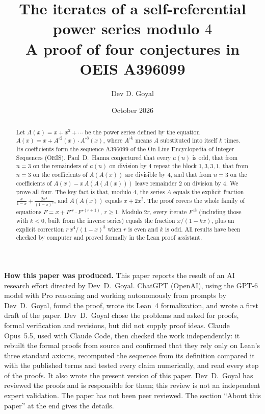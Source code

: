 \documentclass[11pt,a4paper]{article}
\title{The iterates of a self-referential power series modulo $4$\\[6pt]\large A proof of four conjectures in OEIS A396099}
\author{Dev D. Goyal}
\date{October 2026}
\theoremstyle{definition}
\theoremstyle{remark}
\begin{document}
\maketitle
\begin{abstract}
Let $A(x)=x+x^2+\cdots$ be the power series defined by the equation
$A(x)=x+A^{\circ2}(x)\cdot A^{\circ3}(x)$, where $A^{\circ k}$ means $A$ substituted into
itself $k$ times. Its coefficients form the sequence A396099 of the On-Line Encyclopedia of Integer Sequences
(OEIS). Paul~D.~Hanna conjectured that every $a(n)$ is odd, that from $n=3$ on the remainders of $a(n)$ on division by $4$ repeat
the block $1,3,3,1$, that from $n=3$ on the coefficients of $A(A(x))$ are divisible by $4$, and that from $n=3$ on
the coefficients of $A(x)-x\,A(A(A(x)))$ leave remainder $2$ on division by $4$. We prove all four. The key fact is that, modulo $4$, the series $A$ equals the explicit fraction
$\frac{x}{1-x}+\frac{2x^4}{(1-x)^3}$, and $A(A(x))$ equals $x+2x^2$. The proof covers the whole family of
equations $F=x+F^{\circ r}\cdot F^{\circ(r+1)}$, $r\ge1$. Modulo $2r$, every iterate $F^{\circ k}$ (including those
with $k<0$, built from the inverse series) equals the fraction $x/(1-kx)$, plus an explicit correction
$r\,x^4/(1-x)^3$ when $r$ is even and $k$ is odd. All results have been checked by computer and proved formally in the
Lean proof assistant.
\end{abstract}
\begin{center}\begin{minipage}{0.88\linewidth}\small
\textbf{How this paper was produced.} This paper reports the result of an AI research effort directed by
Dev~D.~Goyal. ChatGPT (OpenAI), using the GPT-6 model with Pro reasoning and working autonomously from prompts by
Dev~D.~Goyal, found the proof, wrote its Lean~4 formalization, and wrote a first draft of the paper.
Dev~D.~Goyal chose the problems and asked for proofs, formal verification and revisions, but did not supply proof
ideas. Claude Opus~5.5, used with Claude Code, then checked the work independently: it rebuilt the formal proofs from
source and confirmed that they rely only on Lean's three standard axioms, recomputed the sequence from its definition
compared it with the published terms and tested every claim numerically, and read every step of the proofs. It also wrote the present
version of this paper.
Dev~D.~Goyal has reviewed the proofs and is responsible for them; this review is not an independent expert validation.
The paper has not been peer reviewed.
The section ``About this paper'' at the end gives the details.
\end{minipage}\end{center}
\end{document}
